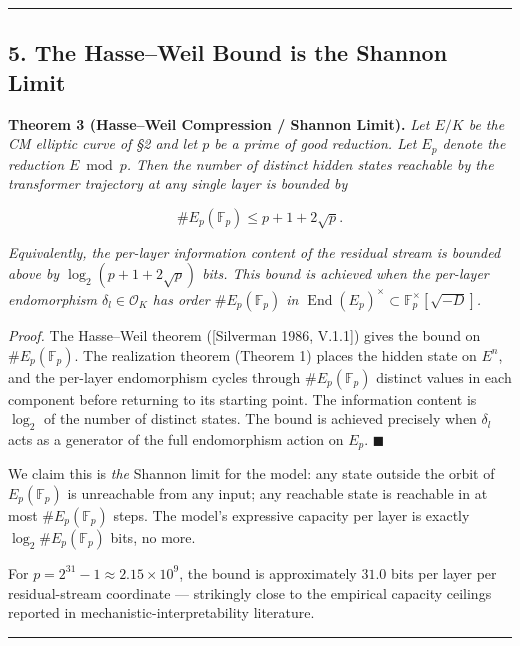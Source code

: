 \documentclass[
  11pt,
]{article}
\begin{document}
\begin{center}\rule{0.5\linewidth}{0.5pt}\end{center}

\hypertarget{the-hasseweil-bound-is-the-shannon-limit}{%
\subsection{5. The Hasse--Weil Bound is the Shannon
Limit}\label{the-hasseweil-bound-is-the-shannon-limit}}

\textbf{Theorem 3 (Hasse--Weil Compression / Shannon Limit).} \emph{Let
\(E / K\) be the CM elliptic curve of §2 and let \(p\) be a prime of
good reduction. Let \(E_p\) denote the reduction \(E \bmod p\). Then the
number of distinct hidden states reachable by the transformer trajectory
at any single layer is bounded by}

\[\#E_p(\mathbb{F}_p) \leq p + 1 + 2\sqrt{p}.\]

\emph{Equivalently, the per-layer information content of the residual
stream is bounded above by \(\log_2(p + 1 + 2\sqrt{p})\) bits. This
bound is achieved when the per-layer endomorphism
\(\delta_l \in \mathcal{O}_K\) has order \(\#E_p(\mathbb{F}_p)\) in
\(\operatorname{End}(E_p)^\times \subset \mathbb{F}_p^\times[\sqrt{-D}]\).}

\emph{Proof.} The Hasse--Weil theorem ({[}Silverman 1986, V.1.1{]})
gives the bound on \(\#E_p(\mathbb{F}_p)\). The realization theorem
(Theorem 1) places the hidden state on \(E^n\), and the per-layer
endomorphism cycles through \(\#E_p(\mathbb{F}_p)\) distinct values in
each component before returning to its starting point. The information
content is \(\log_2\) of the number of distinct states. The bound is
achieved precisely when \(\delta_l\) acts as a generator of the full
endomorphism action on \(E_p\). \(\blacksquare\)

We claim this is \emph{the} Shannon limit for the model: any state
outside the orbit of \(E_p(\mathbb{F}_p)\) is unreachable from any
input; any reachable state is reachable in at most
\(\#E_p(\mathbb{F}_p)\) steps. The model's expressive capacity per layer
is exactly \(\log_2 \#E_p(\mathbb{F}_p)\) bits, no more.

For \(p = 2^{31} - 1 \approx 2.15 \times 10^9\), the bound is
approximately \(31.0\) bits per layer per residual-stream coordinate ---
strikingly close to the empirical capacity ceilings reported in
mechanistic-interpretability literature.

\begin{center}\rule{0.5\linewidth}{0.5pt}\end{center}
\end{document}

